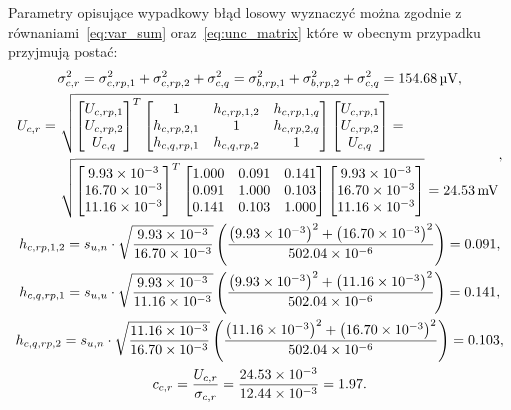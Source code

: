 Parametry opisujące wypadkowy błąd losowy wyznaczyć można zgodnie z równaniami~\eqref{eq:var_sum} oraz~\eqref{eq:unc_matrix} które w obecnym przypadku przyjmują postać:
\begin{gather}
\sigma_{c,r}^{2} = \sigma_{c,rp,1}^{2} + \sigma_{c,rp,2}^{2} + \sigma_{c,q}^{2} = \sigma_{b,rp,1}^{2} + \sigma_{b,rp,2}^{2} + \sigma_{c,q}^{2} = \qty{154.68}{\micro V} \label{eq:sym_partc_rand_var}, \\
\begin{split}
U_{c,r} = ~ & \sqrt{
\begin{bmatrix}
U_{c,rp,1} \\ U_{c,rp,2} \\ U_{c,q}
\end{bmatrix}^{T}
\begin{bmatrix}
1            & h_{c,rp,1,2} & h_{c,rp,1,q} \\
h_{c,rp,2,1} & 1            & h_{c,rp,2,q} \\
h_{c,q,rp,1} & h_{c,q,rp,2} & 1
\end{bmatrix}
\begin{bmatrix}
U_{c,rp,1} \\ U_{c,rp,2} \\ U_{c,q}
\end{bmatrix}} = ~ \\ & \sqrt{
\begin{bmatrix}
\num{9.93e-3} \\ \num{16.70e-3} \\ \num{11.16e-3}
\end{bmatrix}^{T}
\begin{bmatrix}
1.000 & 0.091 & 0.141 \\
0.091 & 1.000 & 0.103 \\
0.141 & 0.103 & 1.000
\end{bmatrix}
\begin{bmatrix}
\num{9.93e-3} \\ \num{16.70e-3} \\ \num{11.16e-3}
\end{bmatrix}} = \qty{24.53}{mV}
\end{split}
\label{eq:sym_partc_rand_uncert}, \\
h_{c,rp,1,2} = s_{u,n} \cdot \sqrt{\frac{\num{9.93e-3}}{\num{16.70e-3}}} \left( \frac{\left(\num{9.93e-3}\right)^{2} + \left(\num{16.70e-3}\right)^{2}}{\num{502.04e-6}} \right) = 0.091 \label{eq:sym_partc_coher_rp_1_2}, \\
h_{c,q,rp,1} = s_{u,u} \cdot \sqrt{\frac{\num{9.93e-3}}{\num{11.16e-3}}} \left( \frac{\left(\num{9.93e-3}\right)^{2} + \left(\num{11.16e-3}\right)^{2}}{\num{502.04e-6}} \right) = 0.141 \label{eq:sym_partc_coher_q_rp_1}, \\
h_{c,q,rp,2} = s_{u,n} \cdot \sqrt{\frac{\num{11.16e-3}}{\num{16.70e-3}}} \left( \frac{\left(\num{11.16e-3}\right)^{2} + \left(\num{16.70e-3}\right)^{2}}{\num{502.04e-6}} \right) = 0.103 \label{eq:sym_partc_coher_q_rp_2}, \\
c_{c,r} = \frac{U_{c,r}}{\sigma_{c,r}} = \frac{\num{24.53e-3}}{\num{12.44e-3}} = 1.97 \label{eq:sym_partc_rand_factor}.
\end{gather}

